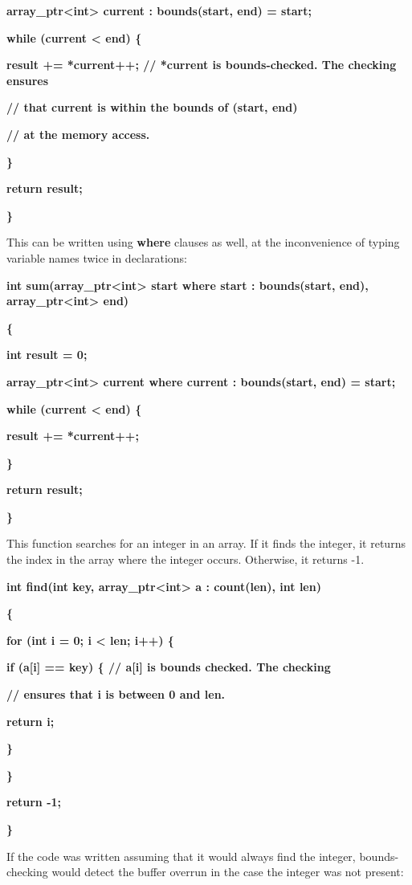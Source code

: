 \documentclass[]{article}
\begin{document}
\textbf{array\_ptr\textless{}int\textgreater{} current : bounds(start,
end) = start;}

\textbf{while (current \textless{} end) \{}

\textbf{result += *current++; // *current is bounds-checked. The
checking ensures }

\textbf{// that current is within the bounds of (start, end) }

\textbf{// at the memory access. }

\textbf{\}}

\textbf{return result;}

\textbf{\}}

This can be written using \textbf{where} clauses as well, at the
inconvenience of typing variable names twice in declarations:

\textbf{int sum(array\_ptr\textless{}int\textgreater{} start where start
: bounds(start, end), array\_ptr\textless{}int\textgreater{} end)}

\textbf{\{ }

\textbf{int result = 0;}

\textbf{array\_ptr\textless{}int\textgreater{} current where current :
bounds(start, end) = start;}

\textbf{while (current \textless{} end) \{}

\textbf{result += *current++; }

\textbf{\}}

\textbf{return result;}

\textbf{\}}

This function searches for an integer in an array. If it finds the
integer, it returns the index in the array where the integer occurs.
Otherwise, it returns -1.

\textbf{int find(int key, array\_ptr\textless{}int\textgreater{} a :
count(len), int len)}

\textbf{\{}

\textbf{for (int i = 0; i \textless{} len; i++) \{}

\textbf{if (a{[}i{]} == key) \{ // a{[}i{]} is bounds checked. The
checking}

\textbf{// ensures that i is between 0 and len.}

\textbf{return i;}

\textbf{\}}

\textbf{\}}

\textbf{return -1;}

\textbf{\}}

If the code was written assuming that it would always find the integer,
bounds-checking would detect the buffer overrun in the case the integer
was not present:
\end{document}
